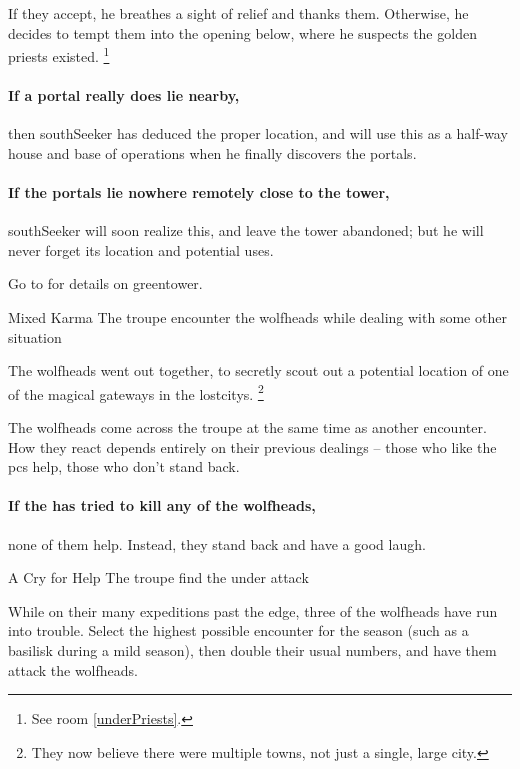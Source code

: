 If they accept, he breathes a sight of relief and thanks them.
Otherwise, he decides to tempt them into the opening below, where he suspects the golden priests existed.%
\footnote{See room \vref{underPriests}.}

\paragraph{If a portal really does lie nearby,}
then \gls{southSeeker} has deduced the proper location, and will use this as a half-way house and base of operations when he finally discovers the portals.

\paragraph{If the portals lie nowhere remotely close to the tower,}
\gls{southSeeker} will soon realize this, and leave the tower abandoned; but he will never forget its location and potential uses.

Go to  for details on \gls{greentower}.

{\squash Mixed Karma}%
{The troupe encounter the \glspl{wolfhead} while dealing with some other situation}%

\begin{exampletext}
  The \glspl{wolfhead} went out together, to secretly scout out a potential location of one of the magical gateways in the \glspl{lostcity}.%
  \footnote{They now believe there were multiple towns, not just a single, large city.}
\end{exampletext}

The \glspl{wolfhead} come across the troupe at the same time as another encounter.
How they react depends entirely on their previous dealings -- those who like the \glspl{pc} help, those who don't stand back.

\paragraph{If the  has tried to kill any of the \glspl{wolfhead},}
none of them help.
Instead, they stand back and have a good laugh.

{A Cry for Help}%
{The troupe find the  under attack}%

While on their many expeditions past the \gls{edge}, three of the \glspl{wolfhead} have run into trouble.
Select the highest possible encounter for the season (such as a basilisk during a mild season), then double their usual numbers, and have them attack the \glspl{wolfhead}.

